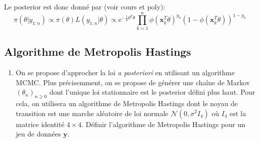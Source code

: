 \documentclass[]{article}
\providecommand{\tightlist}{%
  \setlength{\itemsep}{0pt}\setlength{\parskip}{0pt}}
\newenvironment{Correction}%
  { \vspace{\baselineskip}\begin{mdframed}[backgroundcolor=my_green]}%
  {\end{mdframed}}
\begin{document}
\begin{Correction}
Le posterior est donc donné par (voir cours et poly):
$$\pi(\theta \vert y_{1:n}) \propto \pi(\theta) L(y_{1:n}\vert \theta) \propto \text{e}^{-\frac{1}{8}\theta^T\theta} \prod_{k = 1}^n \phi(\mathbf{x}_k^T\theta)^{y_k} (1 - \phi(\mathbf{x}_k^T\theta))^{1 - y_k}$$
\end{Correction}

\hypertarget{algorithme-de-metropolis-hastings}{%
\subsection{Algorithme de Metropolis
Hastings}\label{algorithme-de-metropolis-hastings}}

\begin{enumerate}
\def\labelenumi{\arabic{enumi}.}
\setcounter{enumi}{1}
\tightlist
\item
  On se propose d'approcher la loi \emph{a posteriori} en utilisant un
  algorithme MCMC. Plus précisemment, on se propose de générer une
  chaîne de Markov \((\theta_n)_{n\geq 0}\) dont l'unique loi
  stationnaire est le posterior défini plus haut. Pour cela, on
  utilisera un algorithme de Metropolis Hastings dont le noyau de
  transition est une marche aléatoire de loi normale
  \(\mathcal{N}(0, \sigma^2 I_4)\) où \(I_4\) est la matrice identité
  \(4\times 4\). Définir l'algorithme de Metropolis Hastings pour un jeu
  de données \(\mathbf{y}\).
\end{enumerate}
\end{document}
